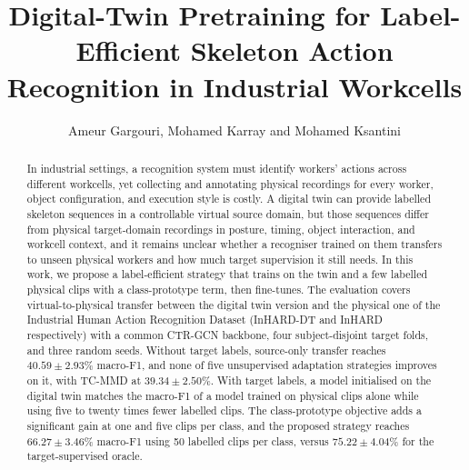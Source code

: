 \documentclass[Royal,sagev,times]{sagej}
\begin{document}

\title{Digital-Twin Pretraining for Label-Efficient Skeleton Action Recognition in Industrial Workcells}

\author{Ameur Gargouri,
  Mohamed Karray and Mohamed Ksantini}



\begin{abstract}
  In industrial settings, a recognition system must identify workers' actions
  across different workcells, yet collecting and annotating physical recordings
  for every worker, object configuration, and execution style is costly. A
  digital twin can provide labelled skeleton sequences in a controllable virtual
  source domain, but those sequences differ from physical target-domain
  recordings in posture, timing, object interaction, and workcell context, and
  it remains unclear whether a recogniser trained on them transfers to unseen
  physical workers and how much target supervision it still needs. In this
  work, we propose a label-efficient strategy that trains on the twin and a few
  labelled physical clips with a class-prototype term, then fine-tunes. The
  evaluation covers virtual-to-physical transfer between the digital twin version and
  the     physical one of the Industrial Human Action Recognition Dataset (InHARD-DT and InHARD respectively) with a common CTR-GCN backbone, four
  subject-disjoint target folds, and three random seeds. Without target labels,
  source-only transfer reaches $40.59\pm2.93\%$ macro-F1, and none of five
  unsupervised adaptation strategies improves on it, with TC-MMD at
  $39.34\pm2.50\%$. With target labels, a model initialised
  on the digital twin matches the macro-F1 of a model trained on physical clips
  alone while using five to twenty times fewer labelled clips. The
  class-prototype objective adds a significant gain at one and five clips per
  class, and the proposed strategy reaches
  $66.27\pm3.46\%$ macro-F1 using 50 labelled clips per class, versus
  $75.22\pm4.04\%$ for the target-supervised oracle.
\end{abstract}

\end{document}
